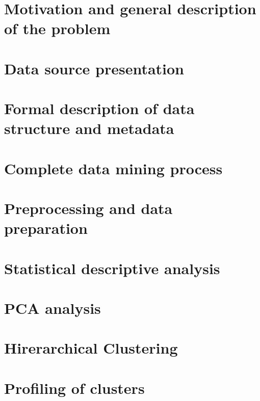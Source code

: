 \documentclass[11pt]{article}
\begin{document}
%

\section{Motivation and general description of the problem}

\newpage

\section{Data source presentation}


\section{Formal description of data structure and metadata}


\section{Complete data mining process}

\newpage

\section{Preprocessing and data preparation}

\newpage

\section{Statistical descriptive analysis}

\newpage

\section{PCA analysis}

\newpage

\section{Hirerarchical Clustering}

\newpage

\section{Profiling of clusters}

\newpage
\end{document}

